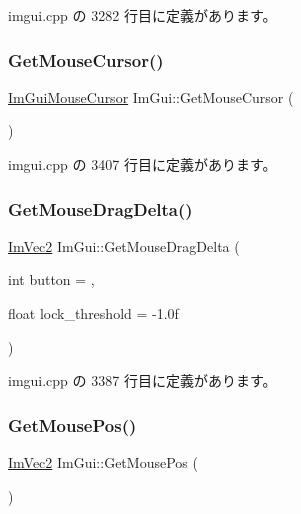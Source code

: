  imgui.\+cpp の 3282 行目に定義があります。

\mbox{\label{namespace_im_gui_a3b955bb840a2411f7c19ac6687d57392}} 
\subsubsection{\texorpdfstring{Get\+Mouse\+Cursor()}{GetMouseCursor()}}
{\footnotesize\ttfamily \mbox{\hyperlink{imgui_8h_a9223d6c82bb5d12c2eab5f829ca520ef}{Im\+Gui\+Mouse\+Cursor}} Im\+Gui\+::\+Get\+Mouse\+Cursor (\begin{DoxyParamCaption}{ }\end{DoxyParamCaption})}



 imgui.\+cpp の 3407 行目に定義があります。

\mbox{\label{namespace_im_gui_a94b8aecab8a4128145fea1ad7d381197}} 
\subsubsection{\texorpdfstring{Get\+Mouse\+Drag\+Delta()}{GetMouseDragDelta()}}
{\footnotesize\ttfamily \mbox{\hyperlink{struct_im_vec2}{Im\+Vec2}} Im\+Gui\+::\+Get\+Mouse\+Drag\+Delta (\begin{DoxyParamCaption}\item[{int}]{button = {},  }\item[{float}]{lock\+\_\+threshold = {\ttfamily -\/1.0f} }\end{DoxyParamCaption})}



 imgui.\+cpp の 3387 行目に定義があります。

\mbox{\label{namespace_im_gui_abf11873349874c5d302861583c00d451}} 
\subsubsection{\texorpdfstring{Get\+Mouse\+Pos()}{GetMousePos()}}
{\footnotesize\ttfamily \mbox{\hyperlink{struct_im_vec2}{Im\+Vec2}} Im\+Gui\+::\+Get\+Mouse\+Pos (\begin{DoxyParamCaption}{ }\end{DoxyParamCaption})}



